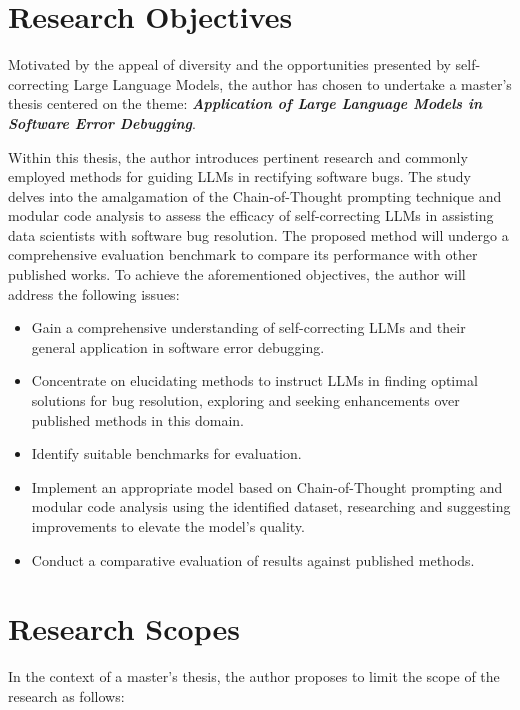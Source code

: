 \documentclass[a4paper,oneside]{book}
\begin{document}
\section{Research Objectives}
Motivated by the appeal of diversity and the opportunities presented by self-correcting Large Language Models, the author has chosen to undertake a master's thesis centered on the theme: \textbf{\textit{Application of Large Language Models in Software Error Debugging}}.

Within this thesis, the author introduces pertinent research and commonly employed methods for guiding LLMs in rectifying software bugs. The study delves into the amalgamation of the Chain-of-Thought prompting technique and modular code analysis to assess the efficacy of self-correcting LLMs in assisting data scientists with software bug resolution. The proposed method will undergo a comprehensive evaluation benchmark to compare its performance with other published works. To achieve the aforementioned objectives, the author will address the following issues:

\begin{itemize}
    \item Gain a comprehensive understanding of self-correcting LLMs and their general application in software error debugging.

    \item Concentrate on elucidating methods to instruct LLMs in finding optimal solutions for bug resolution, exploring and seeking enhancements over published methods in this domain.

    \item Identify suitable benchmarks for evaluation.

    \item Implement an appropriate model based on Chain-of-Thought prompting and modular code analysis using the identified dataset, researching and suggesting improvements to elevate the model's quality.

    \item Conduct a comparative evaluation of results against published methods.
\end{itemize}

\section{Research Scopes}
In the context of a master's thesis, the author proposes to limit the scope of the research as follows:
\end{document}
